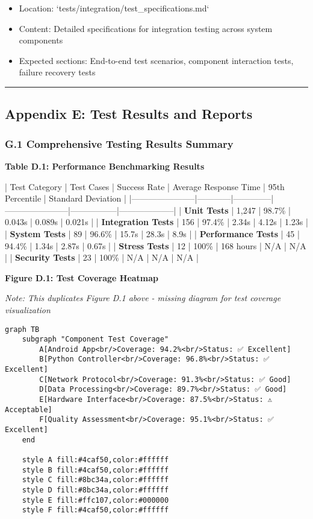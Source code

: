 \documentclass[12pt,a4paper]{article}
\begin{document}
\begin{itemize}
\item Location: `tests/integration/test_specifications.md`
\item Content: Detailed specifications for integration testing across system components
\item Expected sections: End-to-end test scenarios, component interaction tests, failure recovery tests

\end{itemize}
\hrule

\subsection{Appendix E: Test Results and Reports}

\subsubsection{G.1 Comprehensive Testing Results Summary}

\textbf{Table D.1: Performance Benchmarking Results}

| Test Category         | Test Cases | Success Rate | Average Response Time | 95th Percentile | Standard Deviation |
|-----------------------|------------|--------------|-----------------------|-----------------|--------------------|
| \textbf{Unit Tests}        | 1,247      | 98.7\%        | 0.043s                | 0.089s          | 0.021s             |
| \textbf{Integration Tests} | 156        | 97.4\%        | 2.34s                 | 4.12s           | 1.23s              |
| \textbf{System Tests}      | 89         | 96.6\%        | 15.7s                 | 28.3s           | 8.9s               |
| \textbf{Performance Tests} | 45         | 94.4\%        | 1.34s                 | 2.87s           | 0.67s              |
| \textbf{Stress Tests}      | 12         | 100\%         | 168 hours             | N/A             | N/A                |
| \textbf{Security Tests}    | 23         | 100\%         | N/A                   | N/A             | N/A                |

\textbf{Figure D.1: Test Coverage Heatmap}

\textit{Note: This duplicates Figure D.1 above - missing diagram for test coverage visualization}

\begin{verbatim}
graph TB
    subgraph "Component Test Coverage"
        A[Android App<br/>Coverage: 94.2%<br/>Status: ✅ Excellent]
        B[Python Controller<br/>Coverage: 96.8%<br/>Status: ✅ Excellent]
        C[Network Protocol<br/>Coverage: 91.3%<br/>Status: ✅ Good]
        D[Data Processing<br/>Coverage: 89.7%<br/>Status: ✅ Good]
        E[Hardware Interface<br/>Coverage: 87.5%<br/>Status: ⚠️ Acceptable]
        F[Quality Assessment<br/>Coverage: 95.1%<br/>Status: ✅ Excellent]
    end
    
    style A fill:#4caf50,color:#ffffff
    style B fill:#4caf50,color:#ffffff
    style C fill:#8bc34a,color:#ffffff
    style D fill:#8bc34a,color:#ffffff
    style E fill:#ffc107,color:#000000
    style F fill:#4caf50,color:#ffffff
\end{verbatim}
\end{document}
